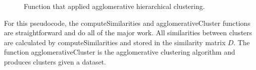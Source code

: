 \documentclass[12pt]{ucthesis}
\begin{document}
      \begin{figure}[!Ht]
         \centering
         \caption{Function that applied agglomerative hierarchical clustering.}
         \label{fig:agglomerative_cluster}
      \end{figure}

      For this pseudocode, the \textsf{computeSimilarities} and
      \textsf{agglomerativeCluster} functions are straightforward and do all of
      the major work. All similarities between clusters are calculated by
      \textsf{computeSimilarities} and stored in the similarity matrix $D$. The
      function \textsf{agglomerativeCluster} is the \textsf{agglomerative
      clustering} algorithm and produces clusters given a dataset.
\end{document}
